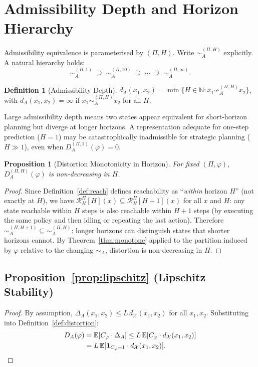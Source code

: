 \documentclass[10pt,twocolumn]{article}
\theoremstyle{plain}
\newtheorem{proposition}{Proposition}
\theoremstyle{definition}
\newtheorem{definition}{Definition}
\theoremstyle{remark}
\newcommand{\simA}{\sim_{\!A}}
\newcommand{\RHP}{\mathcal{R}_{H}^{\Pi}}
\newcommand{\DA}{D_{A}(\varphi)}
\newcommand{\calX}{\mathcal{X}}
\begin{document}
\section{Admissibility Depth and Horizon Hierarchy}
\label{app:depth}

Admissibility equivalence is parameterised by $(\Pi,H)$. Write
$\sim_A^{(\Pi,H)}$ explicitly. A natural hierarchy holds:
\[
  \sim_A^{(\Pi,1)} \;\supseteq\; \sim_A^{(\Pi,10)} \;\supseteq\; \cdots
  \;\supseteq\; \sim_A^{(\Pi,\infty)}.
\]

\begin{definition}[Admissibility Depth]
$d_A(x_1,x_2)=\min\{H\in\mathbb{N}: x_1\not\sim_A^{(\Pi,H)} x_2\}$,
with $d_A(x_1,x_2)=\infty$ if $x_1\sim_A^{(\Pi,H)} x_2$ for all $H$.
\end{definition}

Large admissibility depth means two states appear equivalent for short-horizon
planning but diverge at longer horizons. A representation adequate for one-step
prediction ($H=1$) may be catastrophically inadmissible for strategic planning
($H\gg 1$), even when $D_A^{(\Pi,1)}(\varphi)=0$.

\begin{proposition}[Distortion Monotonicity in Horizon]
\label{prop:horizon_mono}
For fixed $(\Pi,\varphi)$, $D_A^{(\Pi,H)}(\varphi)$ is non-decreasing in $H$.
\end{proposition}

\begin{proof}
Since Definition~\ref{def:reach} defines reachability as ``\emph{within} horizon
$H$'' (not exactly at $H$), we have $\RHP[H](x)\subseteq\RHP[H+1](x)$ for all
$x$ and $H$: any state reachable within $H$ steps is also reachable within $H+1$
steps (by executing the same policy and then idling or repeating the last action).
Therefore $\sim_A^{(\Pi,H+1)}\subseteq\sim_A^{(\Pi,H)}$: longer horizons can
distinguish states that shorter horizons cannot. By
Theorem~\ref{thm:monotone} applied to the partition induced by $\varphi$ relative
to the changing $\simA$, distortion is non-decreasing in $H$.
\end{proof}

\subsection*{Proposition~\ref{prop:lipschitz} (Lipschitz Stability)}

\begin{proof}
By assumption, $\Delta_A(x_1,x_2)\leq L\,d_\calX(x_1,x_2)$ for all $x_1,x_2$.
Substituting into Definition~\ref{def:distortion}:
\begin{align*}
  \DA &= \mathbb{E}[C_\varphi\cdot\Delta_A]
  \leq L\,\mathbb{E}[C_\varphi\cdot d_\calX(x_1,x_2)]\\
  &= L\,\mathbb{E}[\mathbf{1}_{C_\varphi=1}\cdot d_\calX(x_1,x_2)].\qedhere
\end{align*}
\end{proof}
\end{document}
